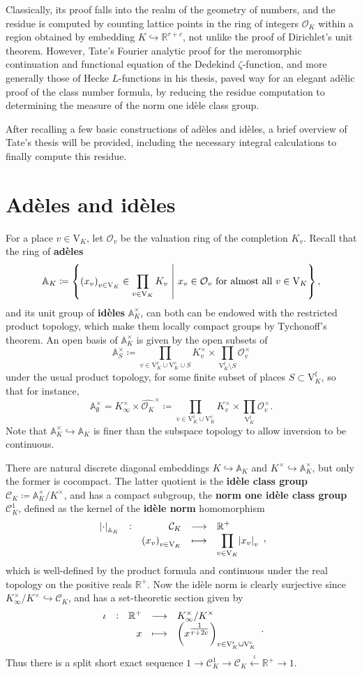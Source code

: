 \documentclass{article}
\newcommand{\1}{\mathbbm{1}}
\renewcommand{\AA}{\mathbb{A}}
\newcommand{\br}{\del}
\renewcommand{\c}{\mathrm{c}}
\newcommand{\CCC}{\mathcal{C}}
\newcommand{\f}{\mathrm{f}}
\newcommand{\OOO}{\mathcal{O}}
\renewcommand{\r}{\mathrm{r}}
\newcommand{\RR}{\mathbb{R}}
\newcommand{\st}{\ \middle| \ }
\newcommand{\V}{\mathrm{V}}
\newcommand{\function}[5]{
  \begin{array}{ccrcl}
    \displaystyle #1 & : & \displaystyle #2 & \longrightarrow & \displaystyle #3 \\
                     &   & \displaystyle #4 & \longmapsto     & \displaystyle #5
  \end{array}
}
\begin{document}
Classically, its proof falls into the realm of the geometry of numbers, and the residue is computed by counting lattice points in the ring of integers $ \OOO_K $ within a region obtained by embedding $ K \hookrightarrow \RR^{r + c} $, not unlike the proof of Dirichlet's unit theorem. However, Tate's Fourier analytic proof for the meromorphic continuation and functional equation of the Dedekind $ \zeta $-function, and more generally those of Hecke $ L $-functions in his thesis, paved way for an elegant ad\`elic proof of the class number formula, by reducing the residue computation to determining the measure of the norm one id\`ele class group.

After recalling a few basic constructions of ad\`eles and id\`eles, a brief overview of Tate's thesis will be provided, including the necessary integral calculations to finally compute this residue.

\pagebreak

\section{Ad\`eles and id\`eles}

For a place $ v \in \V_K $, let $ \OOO_v $ be the valuation ring of the completion $ K_v $. Recall that the ring of \textbf{ad\`eles}
$$ \AA_K \coloneqq \cbr{\br{x_v}_{v \in \V_K} \in \prod_{v \in \V_K} K_v \st x_v \in \OOO_v \ \text{for almost all} \ v \in \V_K}, $$
and its unit group of \textbf{id\`eles} $ \AA_K^\times $, can both can be endowed with the restricted product topology, which make them locally compact groups by Tychonoff's theorem. An open basis of $ \AA_K^\times $ is given by the open subsets of
$$ \AA_S^\times \coloneqq \prod_{v \in \V_K^\r \cup \V_K^\c \cup S} K_v^\times \times \prod_{\V_K^\f \setminus S} \OOO_v^\times $$
under the usual product topology, for some finite subset of places $ S \subset \V_K^\f $, so that for instance,
$$ \AA_\emptyset^\times = K_\infty^\times \times \widehat{\OOO_K}^\times \coloneqq \prod_{v \in \V_K^\r \cup \V_K^\c} K_v^\times \times \prod_{\V_K^\f} \OOO_v^\times. $$
Note that $ \AA_K^\times \hookrightarrow \AA_K $ is finer than the subspace topology to allow inversion to be continuous.

There are natural discrete diagonal embeddings $ K \hookrightarrow \AA_K $ and $ K^\times \hookrightarrow \AA_K^\times $, but only the former is cocompact. The latter quotient is the \textbf{id\`ele class group} $ \CCC_K \coloneqq \AA_K^\times / K^\times $, and has a compact subgroup, the \textbf{norm one id\`ele class group} $ \CCC_K^1 $, defined as the kernel of the \textbf{id\`ele norm} homomorphism
$$ \function{\abs{\cdot}_{\AA_K}}{\CCC_K}{\RR^+}{\br{x_v}_{v \in \V_K}}{\prod_{v \in \V_K} \abs{x_v}_v}, $$
which is well-defined by the product formula and continuous under the real topology on the positive reals $ \RR^+ $. Now the id\`ele norm is clearly surjective since $ K_\infty^\times / K^\times \hookrightarrow \CCC_K $, and has a set-theoretic section given by
$$ \function{\iota}{\RR^+}{K_\infty^\times / K^\times}{x}{\br{x^{\tfrac{1}{r + 2c}}}_{v \in \V_K^\r \cup \V_K^\c}}. $$
Thus there is a split short exact sequence $ 1 \to \CCC_K^1 \to \CCC_K \xleftarrow{\iota} \RR^+ \to 1 $.
\end{document}
